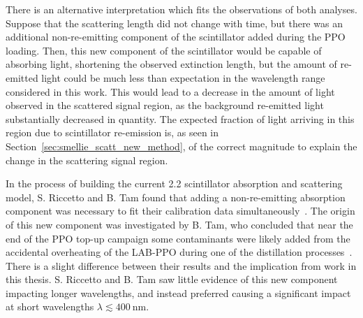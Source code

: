There is an alternative interpretation which fits the observations of both analyses. Suppose that the scattering length did not change with time, but there was an additional non-re-emitting component of the scintillator added during the PPO loading. Then, this new component of the scintillator would be capable of absorbing light, shortening the observed extinction length, but the amount of re-emitted light could be much less than expectation in the wavelength range considered in this work. This would lead to a decrease in the amount of light observed in the scattered signal region, as the background re-emitted light substantially decreased in quantity. The expected fraction of light arriving in this region due to scintillator re-emission is, as seen in Section~\ref{sec:smellie_scatt_new_method}, of the correct magnitude to explain the change in the scattering signal region.

In the process of building the current \SI{2.2}{\gpl} scintillator absorption and scattering model, S. Riccetto and B. Tam found that adding a non-re-emitting absorption component was necessary to fit their calibration data simultaneously~\cite{kaptanogluDocumentationAttenuationStudies2022}. %
The origin of this new component was investigated by B. Tam, who concluded that near the end of the PPO top-up campaign some contaminants were likely added from the accidental overheating of the LAB-PPO during one of the distillation processes~\cite{tamAttenuationMeasurements2022}. %
There is a slight difference between their results and the implication from work in this thesis. S. Riccetto and B. Tam saw little evidence of this new component impacting longer wavelengths, and instead preferred causing a significant impact at short wavelengths $\lambda\lesssim\SI{400}{\nm}$.

